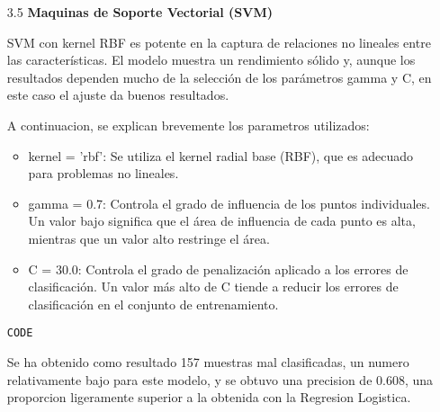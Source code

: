 \documentclass{article}
\begin{document}
\begin{itemize}

\item[3.5]  {\bf Maquinas de Soporte Vectorial (SVM)}

SVM con kernel RBF es potente en la captura de relaciones no lineales entre las características. El modelo muestra un rendimiento sólido y, aunque los resultados dependen mucho de la selección de los parámetros gamma y C, en este caso el ajuste da buenos resultados.

A continuacion, se explican brevemente los parametros utilizados:

\begin{itemize}

\item
kernel = 'rbf': Se utiliza el kernel radial base (RBF), que es adecuado para problemas no lineales.

\item
gamma = 0.7: Controla el grado de influencia de los puntos individuales. Un valor bajo significa que el área de influencia de cada punto es alta, mientras que un valor alto restringe el área.

\item
C = 30.0: Controla el grado de penalización aplicado a los errores de clasificación. Un valor más alto de C tiende a reducir los errores de clasificación en el conjunto de entrenamiento.

\end{itemize}

\begin{tcolorbox}[width=14cm]
\begin{scriptsize}
\begin{verbatim}
CODE
\end{verbatim}
\end{scriptsize}
\end{tcolorbox}

Se ha obtenido como resultado 157 muestras mal clasificadas, un numero relativamente bajo para este modelo, y se obtuvo una precision de 0.608, una proporcion ligeramente superior a la obtenida con la Regresion Logistica.

\end{itemize}

\bigskip
\end{document}
